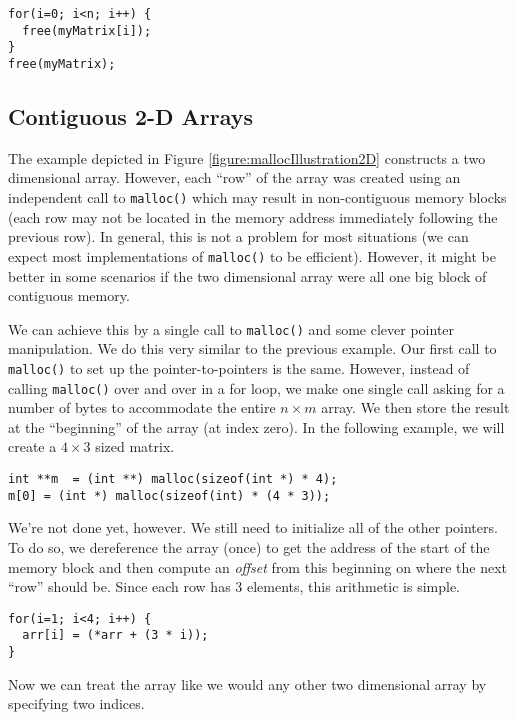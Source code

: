 \begin{verbatim}
for(i=0; i<n; i++) {
  free(myMatrix[i]);
}
free(myMatrix);
\end{verbatim}

\subsection{Contiguous 2-D Arrays}
\label{subsection:contiguous2DArrays}

The example depicted in Figure \ref{figure:mallocIllustration2D} 
constructs a two dimensional array.  However, each ``row'' of the
array was created using an independent call to \texttt{malloc()}
which may result in non-contiguous memory blocks (each row may not
be located in the memory address immediately following the previous
row).  In general, this is not a problem for most situations
(we can expect most implementations of \texttt{malloc()}
to be efficient).  However, it might be better in some scenarios if 
the two dimensional array were all one big block of contiguous memory.  

We can achieve this by a single call to \texttt{malloc()} and
some clever pointer manipulation.  We do this very similar to the
previous example.  Our first call to \texttt{malloc()} to set
up the pointer-to-pointers is the same.  However, instead of calling
\texttt{malloc()} over and over in a for loop, we make one
single call asking for a number of bytes to accommodate the entire
$n \times m$ array.  We then store the result at the ``beginning''
of the array (at index zero).  In the following example, we will
create a $4 \times 3$ sized matrix.

\begin{verbatim}
int **m  = (int **) malloc(sizeof(int *) * 4);
m[0] = (int *) malloc(sizeof(int) * (4 * 3));
\end{verbatim}

We're not done yet, however.  We still need to initialize all of the
other pointers.  To do so, we dereference the array (once) to get
the address of the start of the memory block and then compute
an \emph{offset} from this beginning on where the next ``row'' should
be.  Since each row has 3 elements, this arithmetic
is simple.

\begin{verbatim}
for(i=1; i<4; i++) {
  arr[i] = (*arr + (3 * i));
}
\end{verbatim}

Now we can treat the array like we would any other two dimensional array
by specifying two indices.


